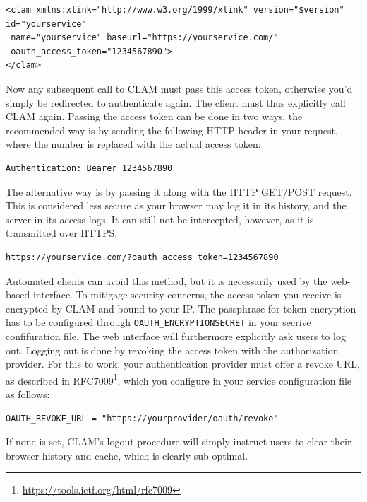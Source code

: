 \documentclass[a4paper,12pt,twoside,openright]{report}
\begin{document}
{ \small
\begin{verbatim}
<clam xmlns:xlink="http://www.w3.org/1999/xlink" version="$version"
id="yourservice"
 name="yourservice" baseurl="https://yourservice.com/"
 oauth_access_token="1234567890">
</clam>
\end{verbatim}
}

Now any subsequent call to CLAM must pass this access token, otherwise you'd
simply be redirected to authenticate again. The client must thus explicitly call CLAM
again. Passing the access token can be done in two ways, the recommended way is
by sending the following HTTP header in your request, where the number is
replaced with the actual access token:

{ \small
\begin{verbatim}
Authentication: Bearer 1234567890
\end{verbatim}
}

The alternative way is by passing it along with the HTTP GET/POST request. This
is considered less secure as your browser may log it in its history, and the
server in its access logs. It can still not be intercepted, however, as it is
transmitted over HTTPS.

{ \small
\begin{verbatim}
https://yourservice.com/?oauth_access_token=1234567890
\end{verbatim}
}

Automated clients can avoid this method, but it is necessarily used by the
web-based interface. To mitigage security concerns, the access token you
receive is encrypted by CLAM and bound to your IP. The passphrase for token
encryption has to be configured through \texttt{OAUTH\_ENCRYPTIONSECRET} in
your secrive confifuration file. The web interface will furthermore explicitly
ask users to log out. Logging out is done by revoking the access token with the
authorization provider. For this to work, your authentication provider must
offer a revoke URL, as described in RFC7009\footnote{
\url{https://tools.ietf.org/html/rfc7009}}, which you configure in your service
configuration file as follows:

{ \small
\begin{verbatim}
OAUTH_REVOKE_URL = "https://yourprovider/oauth/revoke"
\end{verbatim}
}

If none is set, CLAM's logout procedure will simply instruct users to clear
their browser history and cache, which is clearly sub-optimal.
\end{document}
